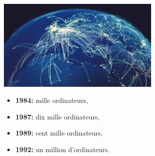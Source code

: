 \documentclass[svgnames,11pt]{beamer}
\begin{document}
\begin{frame}

    \begin{center}
    \centering
    \includegraphics[width=8cm]{ressources/connexion.jpeg}
    \label{IMG}
    \end{center}
    \begin{itemize}
        \item \textbf{1984: }mille ordinateurs,
        \item \textbf{1987: }dix mille ordinateurs,
        \item \textbf{1989: }cent mille ordinateurs,
        \item \textbf{1992: }un million d'ordinateurs.
    \end{itemize}
\end{frame}
\end{document}
